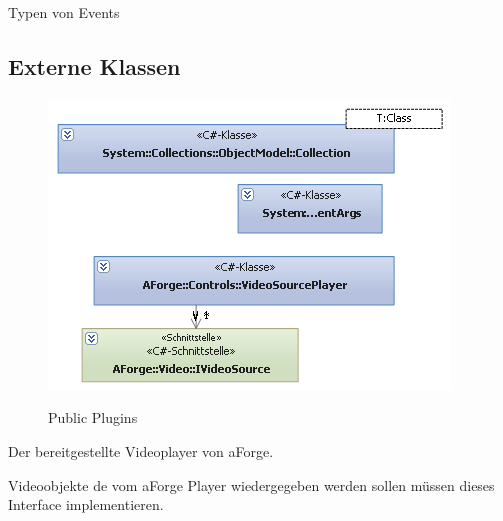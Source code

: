 Typen von Events


\pagebreak
\subsection{Externe Klassen}
\begin{figure}[h]
\includegraphics[scale=1]{bilder/rest.png}
\label{}
\caption{Public Plugins}
\end{figure}




Der bereitgestellte Videoplayer von aForge.


Videoobjekte de vom aForge Player wiedergegeben werden sollen müssen dieses Interface implementieren.
